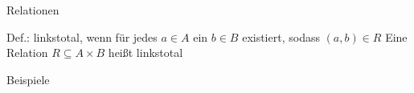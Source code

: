 	\begin{frame}{Relationen}
		\begin{block}{Def.: linkstotal}, wenn für jedes $a \in A$ ein $b \in B$ existiert, sodass $(a,b) \in R$
			Eine Relation $R \subseteq A \times B$ heißt linkstotal
		\end{block}
	
		\begin{exampleblock}{Beispiele}
	
		\end{exampleblock}
	\end{frame}



\section{}
\questionframe
\lastframe
{}

